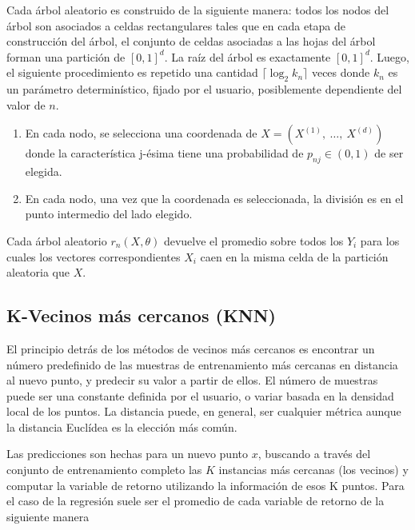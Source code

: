   \par Cada árbol aleatorio es construido de la siguiente manera: todos los nodos
    del árbol son asociados a celdas rectangulares tales que en cada etapa de
    construcción del árbol, el conjunto de celdas asociadas a las hojas del árbol
    forman una partición de $[0, 1]^{d}$. La raíz del árbol es exactamente $[0, 1]^{d}$.
    Luego, el siguiente procedimiento es repetido una cantidad $\lceil \log_{2}k_{n} \rceil$ veces
    donde $k_{n}$ es un parámetro determinístico, fijado por el usuario, posiblemente
    dependiente del valor de $n$.

    \begin{enumerate}
      \item En cada nodo, se selecciona una coordenada de $X = (X^{(1)}, \ \dots,\ X^{(d)})$
            donde la característica j-ésima tiene una probabilidad de $p_{nj} \in (0,1)$
            de ser elegida.
      \item En cada nodo, una vez que la coordenada es seleccionada, la división es
            en el punto intermedio del lado elegido.
    \end{enumerate}

    Cada árbol aleatorio $r_{n}(X, \theta)$ devuelve el promedio sobre todos los
    $Y_{i}$ para los cuales los vectores correspondientes $X_{i}$ caen en la misma
    celda de la partición aleatoria que $X$.


\subsection{K-Vecinos más cercanos (KNN)}
  \par El principio detrás de los métodos de vecinos más cercanos es encontrar un
    número predefinido de las muestras de entrenamiento más cercanas en distancia
    al nuevo punto, y predecir su valor a partir de ellos.
    El número de muestras puede ser una constante definida por el usuario, o
    variar basada en la densidad local de los puntos. La distancia puede, en general,
    ser cualquier métrica aunque la distancia Euclídea es la elección más común.

  \par Las predicciones son hechas para un nuevo punto $x$, buscando a través del conjunto
    de entrenamiento completo las $K$ instancias más cercanas (los vecinos) y computar
    la variable de retorno utilizando la información de esos K puntos. Para el caso
    de la regresión suele ser el promedio de cada variable de retorno de la siguiente
    manera

